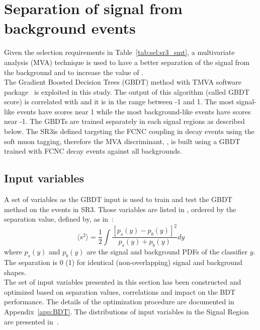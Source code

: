 \section{Separation of signal from background events}
\label{sec:separation}
Given the selection requirements in Table~\ref{tab:sel:sr3_smt}, a multivariate analysis (MVA) technique is used to have a better separation of the signal from the background and to increase the value of \ssplusb.\\ 
The Gradient Boosted Decision Trees (GBDT) method with TMVA software package~\cite{BDTG,TMVA} is exploited in this study. 
The output of this algorithm (called GBDT score) is correlated with \ssplusb and it is in the range between -1 and 1.
The most signal-like events have scores near 1 while the most background-like events have scores near -1. The GBDTs are trained separately in each signal regions as described below.
The SR3\tZc is defined targeting the FCNC \tZc coupling in \ttbar decay events
using the soft muon tagging, therefore the MVA discriminant, \Dthree, is built using a GBDT trained with FCNC \tZc \ttbar decay events against all backgrounds.

\subsection {Input variables}
\label{sec:input_var}
A set of variables as the GBDT input is used to train and test the GBDT method on the events in SR3\tZc. Those variables are listed in , ordered by the separation value, defined by, as in~\cite{TMVA}:
\begin{equation*}
\langle s^{2}\rangle = \frac{1}{2}\int \frac{[p_{s}(y)-p_{b}(y)]^{2}}{p_{s}(y)+p_{b}(y)}dy
\end{equation*}
where $p_{s}(y)$ and $p_{b}(y)$ are the signal and background PDFs of the classifier $y$. 
The separation is 0 (1) for identical (non-overlapping) signal and background shapes.\\
The set of input variables presented in this section has been constructed and optimized based on separation values, correlations and impact on the BDT performance. The details of the optimization procedure are documented in Appendix~\ref{app:BDT}.  
The distributions of input variables in the Signal Region are presented in~.

